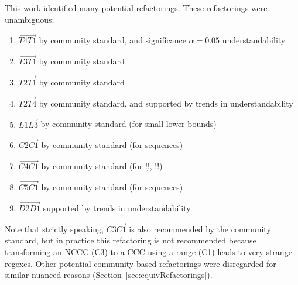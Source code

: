 This work identified many potential refactorings.  These refactorings were unambiguous:
\begin{enumerate}
\item $\overrightarrow{T4 T1}$ by community standard, and significance $\alpha=0.05$ understandability
\item $\overrightarrow{T3 T1}$ by community standard
\item $\overrightarrow{T2 T1}$ by community standard
\item $\overrightarrow{T2 T4}$ by community standard, and supported by trends in understandability

\item $\overrightarrow{L1 L3}$ by community standard (for small lower bounds)
\item $\overrightarrow{C2 C1}$ by community standard (for sequences)
\item $\overrightarrow{C4 C1}$ by community standard (for \bverb!\d!, \bverb!\w!)
\item $\overrightarrow{C5 C1}$ by community standard (for sequences)
\item $\overrightarrow{D2 D1}$ supported by trends in understandability
\end{enumerate}
Note that strictly speaking, $\overrightarrow{C3 C1}$ is also recommended by the community standard, but in practice this refactoring is not recommended because transforming an NCCC (C3) to a CCC using a range (C1) leads to very strange regexes.  Other potential community-based refactorings were disregarded for similar nuanced reasons (Section~\ref{sec:equivRefactorings}).


